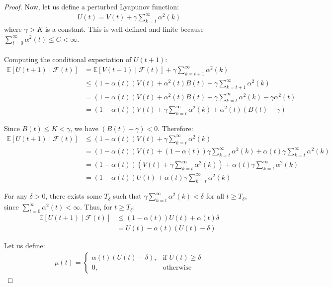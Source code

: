 \begin{proof}
\noindent Now, let us define a perturbed Lyapunov function:
\begin{align*}
U(t) = V(t) + \gamma \sum_{k=t}^{\infty} \alpha^2(k)
\end{align*}
where $\gamma > K$ is a constant. This is well-defined and finite because $\sum_{t=0}^{\infty} \alpha^2(t) \leq C < \infty$.\\
\\
Computing the conditional expectation of $U(t+1)$:
\begin{align*}
\mathbb{E}[U(t+1) \mid \mathcal{F}(t)] &= \mathbb{E}[V(t+1) \mid \mathcal{F}(t)] + \gamma \sum_{k=t+1}^{\infty} \alpha^2(k) \\
&\leq (1 - \alpha(t))V(t) + \alpha^2(t)B(t) + \gamma \sum_{k=t+1}^{\infty} \alpha^2(k) \\
&= (1 - \alpha(t))V(t) + \alpha^2(t)B(t) + \gamma \sum_{k=t}^{\infty} \alpha^2(k) - \gamma \alpha^2(t) \\
&= (1 - \alpha(t))V(t) + \gamma \sum_{k=t}^{\infty} \alpha^2(k) + \alpha^2(t)(B(t) - \gamma)
\end{align*}

\noindent Since $B(t) \leq K < \gamma$, we have $(B(t) - \gamma) < 0$. Therefore:
\begin{align*}
\mathbb{E}[U(t+1) \mid \mathcal{F}(t)] &\leq (1 - \alpha(t))V(t) + \gamma \sum_{k=t}^{\infty} \alpha^2(k) \\
&= (1 - \alpha(t))V(t) + (1 - \alpha(t))\gamma \sum_{k=t}^{\infty} \alpha^2(k) + \alpha(t)\gamma \sum_{k=t}^{\infty} \alpha^2(k) \\
&= (1 - \alpha(t))\left(V(t) + \gamma \sum_{k=t}^{\infty} \alpha^2(k)\right) + \alpha(t)\gamma \sum_{k=t}^{\infty} \alpha^2(k) \\
&= (1 - \alpha(t))U(t) + \alpha(t)\gamma \sum_{k=t}^{\infty} \alpha^2(k)
\end{align*}

\noindent For any $\delta > 0$, there exists some $T_\delta$ such that $\gamma \sum_{k=t}^{\infty} \alpha^2(k) < \delta$ for all $t \geq T_\delta$, since $\sum_{t=0}^{\infty} \alpha^2(t) < \infty$. Thus, for $t \geq T_\delta$:
\begin{align*}
\mathbb{E}[U(t+1) \mid \mathcal{F}(t)] &\leq (1 - \alpha(t))U(t) + \alpha(t)\delta \\
&= U(t) - \alpha(t)(U(t) - \delta)
\end{align*}

\noindent Let us define:
\begin{align*}
\mu(t) = 
\begin{cases}
\alpha(t)(U(t) - \delta), & \text{if } U(t) \geq \delta \\
0, & \text{otherwise}
\end{cases}
\end{align*}


\end{proof}
